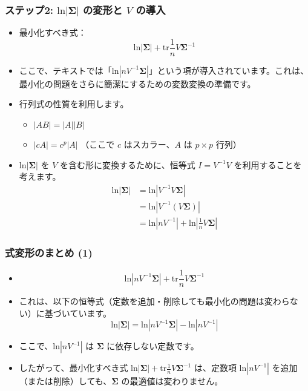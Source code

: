 \documentclass{beamer}
\begin{document}
\begin{frame}
\frametitle{ステップ2: $\text{ln}|\bm{\Sigma}|$ の変形と $V$ の導入}
\begin{itemize}
    \item 最小化すべき式：
    \[ \text{ln}|\bm{\Sigma}|+\text{tr}\frac{1}{n}V\bm{\Sigma}^{-1} \]
    \item ここで、テキストでは「$\text{ln}|nV^{-1}\bm{\Sigma}|$」という項が導入されています。これは、最小化の問題をさらに簡潔にするための変数変換の準備です。
    \item 行列式の性質を利用します。
    \begin{itemize}
        \item $|AB|=|A||B|$
        \item $|cA|=c^p|A|$ （ここで $c$ はスカラー、$A$ は $p \times p$ 行列）
    \end{itemize}
    \item $\text{ln}|\bm{\Sigma}|$ を $V$ を含む形に変換するために、恒等式 $I=V^{-1}V$ を利用することを考えます。
    \begin{align*}
    \text{ln}|\bm{\Sigma}|&=\text{ln}|V^{-1}V\bm{\Sigma}| \\
    &=\text{ln}|V^{-1}(V\bm{\Sigma})| \\
    &=\text{ln}|nV^{-1}|+\text{ln}|\frac{1}{n}V\bm{\Sigma}|
    \end{align*}
\end{itemize}
\end{frame}
\begin{frame}
    \frametitle{式変形のまとめ (1)}
    \begin{itemize}
        \item 
        \[
        \text{ln}|nV^{-1}\bm{\Sigma}|+\text{tr}\frac{1}{n}V\bm{\Sigma}^{-1}
        \]
        \item これは、以下の恒等式（定数を追加・削除しても最小化の問題は変わらない）に基づいています。
        \[
        \text{ln}|\bm{\Sigma}| = \text{ln}|nV^{-1}\bm{\Sigma}| - \text{ln}|nV^{-1}|
        \]
        \item ここで、$\text{ln}|nV^{-1}|$ は $\bm{\Sigma}$ に依存しない定数です。
        \item したがって、最小化すべき式 $\text{ln}|\bm{\Sigma}|+\text{tr}\frac{1}{n}V\bm{\Sigma}^{-1}$ は、定数項 $\text{ln}|nV^{-1}|$ を追加（または削除）しても、$\bm{\Sigma}$ の最適値は変わりません。
    \end{itemize}
\end{frame}
\end{document}
